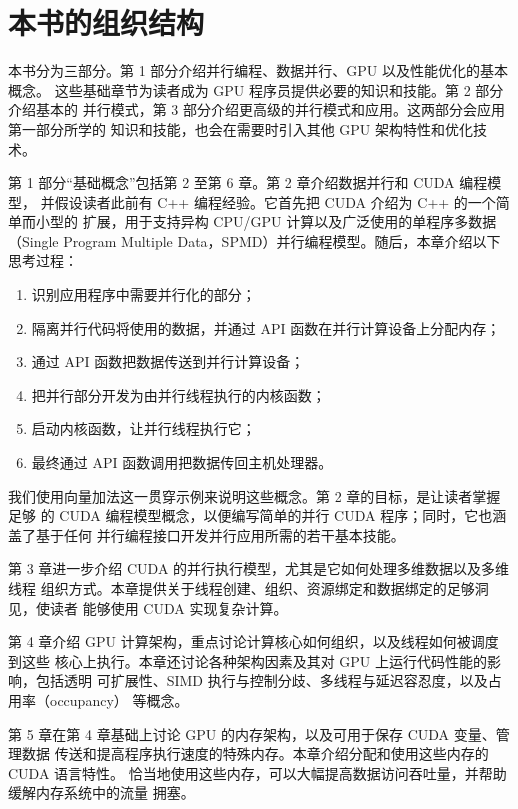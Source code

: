 \section{本书的组织结构}
\label{sec:book-organization}

本书分为三部分。第 1 部分介绍并行编程、数据并行、GPU 以及性能优化的基本概念。
这些基础章节为读者成为 GPU 程序员提供必要的知识和技能。第 2 部分介绍基本的
并行模式，第 3 部分介绍更高级的并行模式和应用。这两部分会应用第一部分所学的
知识和技能，也会在需要时引入其他 GPU 架构特性和优化技术。

第 1 部分“基础概念”包括第 2 至第 6 章。第 2 章介绍数据并行和 CUDA 编程模型，
并假设读者此前有 C++ 编程经验。它首先把 CUDA 介绍为 C++ 的一个简单而小型的
扩展，用于支持异构 CPU/GPU 计算以及广泛使用的单程序多数据（Single Program
Multiple Data，SPMD）并行编程模型。随后，本章介绍以下思考过程：

\begin{enumerate}
  \item 识别应用程序中需要并行化的部分；
  \item 隔离并行代码将使用的数据，并通过 API 函数在并行计算设备上分配内存；
  \item 通过 API 函数把数据传送到并行计算设备；
  \item 把并行部分开发为由并行线程执行的内核函数；
  \item 启动内核函数，让并行线程执行它；
  \item 最终通过 API 函数调用把数据传回主机处理器。
\end{enumerate}

我们使用向量加法这一贯穿示例来说明这些概念。第 2 章的目标，是让读者掌握足够
的 CUDA 编程模型概念，以便编写简单的并行 CUDA 程序；同时，它也涵盖了基于任何
并行编程接口开发并行应用所需的若干基本技能。

第 3 章进一步介绍 CUDA 的并行执行模型，尤其是它如何处理多维数据以及多维线程
组织方式。本章提供关于线程创建、组织、资源绑定和数据绑定的足够洞见，使读者
能够使用 CUDA 实现复杂计算。

第 4 章介绍 GPU 计算架构，重点讨论计算核心如何组织，以及线程如何被调度到这些
核心上执行。本章还讨论各种架构因素及其对 GPU 上运行代码性能的影响，包括透明
可扩展性、SIMD 执行与控制分歧、多线程与延迟容忍度，以及占用率（occupancy）
等概念。

第 5 章在第 4 章基础上讨论 GPU 的内存架构，以及可用于保存 CUDA 变量、管理数据
传送和提高程序执行速度的特殊内存。本章介绍分配和使用这些内存的 CUDA 语言特性。
恰当地使用这些内存，可以大幅提高数据访问吞吐量，并帮助缓解内存系统中的流量
拥塞。

